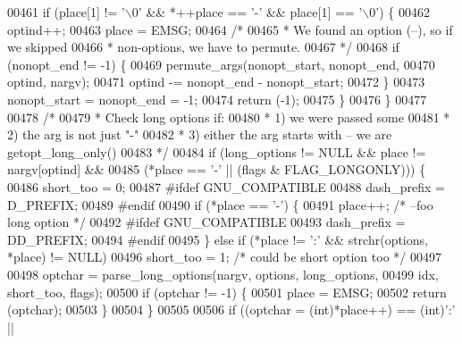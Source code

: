 \begin{DoxyCode}
{{{{{{{{{{{00461         \textcolor{keywordflow}{if} (place[1] != \textcolor{charliteral}{'\(\backslash\)0'} && *++place == \textcolor{charliteral}{'-'} && place[1] == \textcolor{charliteral}{'\(\backslash\)0'}) \{
00462             optind++;
00463             place = EMSG;
00464             \textcolor{comment}{/*}
00465 \textcolor{comment}{             * We found an option (--), so if we skipped}
00466 \textcolor{comment}{             * non-options, we have to permute.}
00467 \textcolor{comment}{             */}
00468             \textcolor{keywordflow}{if} (nonopt\_end != -1) \{
00469                 permute\_args(nonopt\_start, nonopt\_end,
00470                     optind, nargv);
00471                 optind -= nonopt\_end - nonopt\_start;
00472             \}
00473             nonopt\_start = nonopt\_end = -1;
00474             \textcolor{keywordflow}{return} (-1);
00475         \}
00476     \}
00477 
00478     \textcolor{comment}{/*}
00479 \textcolor{comment}{     * Check long options if:}
00480 \textcolor{comment}{     *  1) we were passed some}
00481 \textcolor{comment}{     *  2) the arg is not just "-"}
00482 \textcolor{comment}{     *  3) either the arg starts with -- we are getopt\_long\_only()}
00483 \textcolor{comment}{     */}
00484     \textcolor{keywordflow}{if} (long\_options != NULL && place != nargv[optind] &&
00485         (*place == \textcolor{charliteral}{'-'} || (flags & FLAG\_LONGONLY))) \{
00486         short\_too = 0;
00487 \textcolor{preprocessor}{#ifdef GNU\_COMPATIBLE}
00488         dash\_prefix = D\_PREFIX;
00489 \textcolor{preprocessor}{#endif}
00490         \textcolor{keywordflow}{if} (*place == \textcolor{charliteral}{'-'}) \{
00491             place++;        \textcolor{comment}{/* --foo long option */}
00492 \textcolor{preprocessor}{#ifdef GNU\_COMPATIBLE}
00493             dash\_prefix = DD\_PREFIX;
00494 \textcolor{preprocessor}{#endif}
00495         \} \textcolor{keywordflow}{else} \textcolor{keywordflow}{if} (*place != \textcolor{charliteral}{':'} && strchr(options, *place) != NULL)
00496             short\_too = 1;      \textcolor{comment}{/* could be short option too */}
00497 
00498         optchar = parse\_long\_options(nargv, options, long\_options,
00499             idx, short\_too, flags);
00500         \textcolor{keywordflow}{if} (optchar != -1) \{
00501             place = EMSG;
00502             \textcolor{keywordflow}{return} (optchar);
00503         \}
00504     \}
00505 
00506     \textcolor{keywordflow}{if} ((optchar = (\textcolor{keywordtype}{int})*place++) == (\textcolor{keywordtype}{int})\textcolor{charliteral}{':'} ||
}}}}}}}}}}}
\end{DoxyCode}
